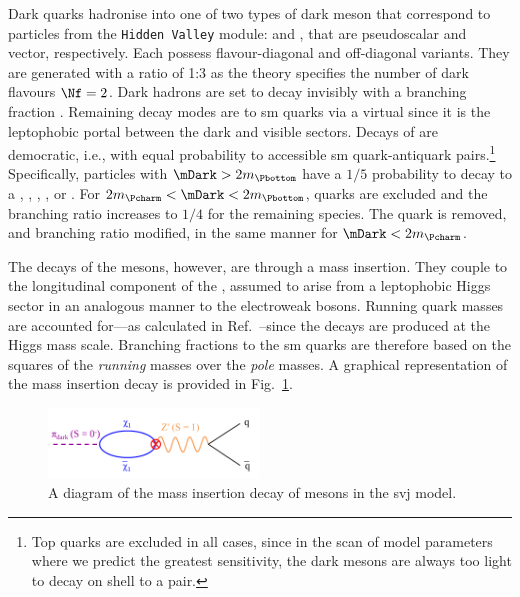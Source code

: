 Dark quarks hadronise into one of two types of dark meson that correspond to particles from the \texttt{Hidden Valley} module: \Ppidark and \Prhodark, that are pseudoscalar and vector, respectively. Each possess flavour-diagonal and off-diagonal variants. They are generated with a ratio of 1:3 as the theory specifies the number of dark flavours $\Nf = \text{2}$. Dark hadrons are set to decay invisibly with a branching fraction \rinv. Remaining decay modes are to \acrshort{sm} quarks via a virtual \PZprime since it is the leptophobic portal between the dark and visible sectors. Decays of \Prhodark are democratic, i.e., with equal probability to accessible \acrshort{sm} quark-antiquark pairs.\footnote{Top quarks are excluded in all cases, since in the scan of model parameters where we predict the greatest sensitivity, the dark mesons are always too light to decay on shell to a \ttbar pair.} Specifically, \Prhodark particles with $\mDark > \text{2}m_{\Pbottom}$ have a $\text{1}/\text{5}$ probability to decay to a \Pup, \Pdown, \Pcharm, \Pstrange, or \Pbottom. For $2m_{\Pcharm} < \mDark < 2m_{\Pbottom}$, \Pbottom quarks are excluded and the branching ratio increases to $\text{1}/\text{4}$ for the remaining species. The \Pcharm quark is removed, and branching ratio modified, in the same manner for $\mDark < 2m_{\Pcharm}$.

The decays of the \Ppidark mesons, however, are through a mass insertion. They couple to the longitudinal component of the \PZprime, assumed to arise from a leptophobic Higgs sector in an analogous manner to the electroweak bosons. Running quark masses are accounted for---as calculated in Ref.~--since the decays are produced at the Higgs mass scale. Branching fractions to the \acrshort{sm} quarks are therefore based on the squares of the \emph{running} masses over the \emph{pole} masses. A graphical representation of the mass insertion decay is provided in Fig.~\ref{fig:svj_mass_insertion}.


\begin{figure}[htbp]
    \centering
    \includegraphics[width=0.5\textwidth]{figures/mass_insertion_diagram.pdf}
    \caption[A diagram of the mass insertion decay of \Ppidark mesons in the \schannel semi-visible jet model]{A diagram of the mass insertion decay of \Ppidark mesons in the \schannel \gls{svj} model.}
    \label{fig:svj_mass_insertion}
\end{figure}

